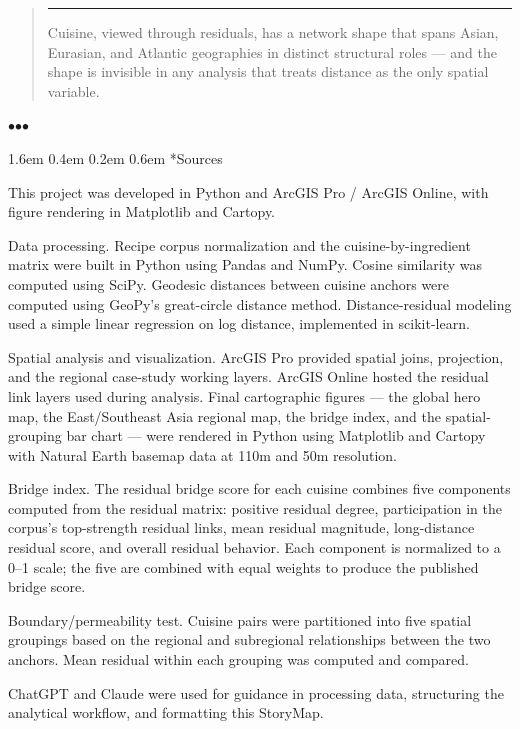 \documentclass[11pt]{article}
\makeatletter
\renewcommand\section{\@startsection{section}{1}{\z@}%
  {1.6em \@plus 0.4em \@minus 0.2em}%
  {0.6em}%
  {\normalfont\Large\bfseries\color{black!85}}}
\newenvironment{pullquote}
  {\begin{quote}\itshape\color{black!72}\hspace*{-0.4em}\rule{2pt}{1em}\hspace{0.6em}}
  {\end{quote}}
\newcommand{\sectionbreak}{%
  \par\nobreak\vspace{0.8em}%
  \par\centerline{\textcolor{black!40}{$\bullet$\quad$\bullet$\quad$\bullet$}}%
  \par\vspace{0.6em}\nobreak%
}
\makeatother
\begin{document}
\begin{pullquote}
Cuisine, viewed through residuals, has a network shape that spans Asian, Eurasian, and Atlantic geographies in distinct structural roles — and the shape is invisible in any analysis that treats distance as the only spatial variable.
\end{pullquote}


\sectionbreak


\section*{Sources}


This project was developed in Python and ArcGIS Pro / ArcGIS Online, with figure rendering in Matplotlib and Cartopy.


Data processing. Recipe corpus normalization and the cuisine-by-ingredient matrix were built in Python using Pandas and NumPy. Cosine similarity was computed using SciPy. Geodesic distances between cuisine anchors were computed using GeoPy's great-circle distance method. Distance-residual modeling used a simple linear regression on log distance, implemented in scikit-learn.


Spatial analysis and visualization. ArcGIS Pro provided spatial joins, projection, and the regional case-study working layers. ArcGIS Online hosted the residual link layers used during analysis. Final cartographic figures — the global hero map, the East/Southeast Asia regional map, the bridge index, and the spatial-grouping bar chart — were rendered in Python using Matplotlib and Cartopy with Natural Earth basemap data at 110m and 50m resolution.


Bridge index. The residual bridge score for each cuisine combines five components computed from the residual matrix: positive residual degree, participation in the corpus's top-strength residual links, mean residual magnitude, long-distance residual score, and overall residual behavior. Each component is normalized to a 0–1 scale; the five are combined with equal weights to produce the published bridge score.


Boundary/permeability test. Cuisine pairs were partitioned into five spatial groupings based on the regional and subregional relationships between the two anchors. Mean residual within each grouping was computed and compared.


ChatGPT and Claude were used for guidance in processing data, structuring the analytical workflow, and formatting this StoryMap.
\end{document}
